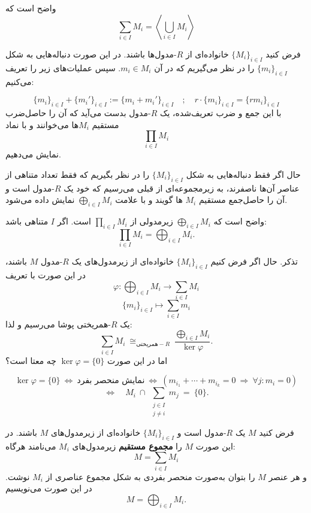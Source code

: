 \begin{lemma}
    واضح است که
    \[
        \sum_{i \in I} M_i = \left\langle \bigcup_{i \in I} M_i \right\rangle
    \]
\end{lemma}

\begin{definition}
    فرض کنید $\{M_i\}_{i \in I}$ خانواده‌ای از $R$-مدول‌ها باشند.
    در این صورت دنباله‌هایی به شکل $\{m_i\}_{i \in I}$ را در نظر می‌گیریم که در آن $m_i \in M_i$. سپس عملیات‌های زیر را تعریف می‌کنیم:

    \[
        \{m_i\}_{i \in I} + \{m_i'\}_{i \in I} := \{m_i + m_i'\}_{i \in I}
        \quad ; \quad
        r \cdot \{m_i\}_{i \in I} = \{r m_i\}_{i \in I}
    \]
    با این جمع و ضرب تعریف‌شده، یک $R$-مدول بدست می‌آید که آن را حاصل‌ضرب مستقیم $M_i$ها می‌خوانند و با نماد
    \[
        \prod_{i \in I} M_i
    \]
    نمایش می‌دهیم.

\end{definition}




حال اگر فقط دنباله‌هایی به شکل
$\{M_i\}_{i \in I}$
را در نظر بگیریم که فقط تعداد متناهی از عناصر آن‌ها
ناصفرند،
به زیرمجموعه‌ای از قبلی می‌رسیم که خود یک
$R$-مدول
است و آن را
حاصل‌جمع مستقیم
$M_i$ ها
گویند و با علامت
\(\bigoplus_{i \in I} M_i\)
نمایش داده می‌شود.

واضح است که
$\bigoplus_{i \in I} M_i$
زیرمدولی از
$\prod_{i \in I} M_i$
است.
اگر $I$ متناهی باشد:
\[
    \prod_{i \in I} M_i = \bigoplus_{i \in I} M_i.
\]


تذکر. حال اگر فرض کنیم $\{M_i\}_{i \in I}$ خانواده‌ای از زیرمدول‌های یک $R$-مدول $M$ باشند، در این صورت با تعریف
\[
    \varphi : \bigoplus_{i \in I} M_i \longrightarrow \sum_{i \in I} M_i
\]
\[
    \{m_i\}_{i \in I} \longmapsto \sum_{i \in I} m_i
\]
یک $R$-همریختی پوشا می‌رسیم و لذا:
\[
    \sum_{i \in I} M_i \ \cong_{\text{همریختی}-R} \ \frac{\bigoplus_{i \in I} M_i}{\ker \varphi}.
\]
اما در این صورت $\ker \varphi = \{0\}$ چه معتا است؟

\[
    \ker \varphi = \{0\} \ \Longleftrightarrow \ \text{نمایش  منحصر بفرد} \ \Longleftrightarrow \
    \left( m_{i_1} + \cdots + m_{i_k} = 0 \ \Rightarrow \ \forall j : m_{i} = 0 \right)
\]
\[
    \Longleftrightarrow \quad M_i \ \cap \ \sum_{\substack{j \in I \\ j \neq i}} m_j \ = \ \{0\}.
\]


\begin{theorem}
    فرض کنید $M$ یک $R$-مدول است و $\{M_i\}_{i \in I}$ خانواده‌ای از زیرمدول‌های $M$ باشند. در این صورت $M$ را \textbf{مجموع مستقیم} زیرمدول‌های $M_i$ می‌نامند هرگاه:
    \[
        M = \sum_{i \in I} M_i
    \]
    و هر عنصر $M$ را بتوان به‌صورت
    منحصر بفردی به شکل مجموع عناصری از
    \(M_i\)
    نوشت.
    در این صورت می‌نویسیم
    \[
        M = \bigoplus_{i \in I} M_i.
    \]

\end{theorem}




